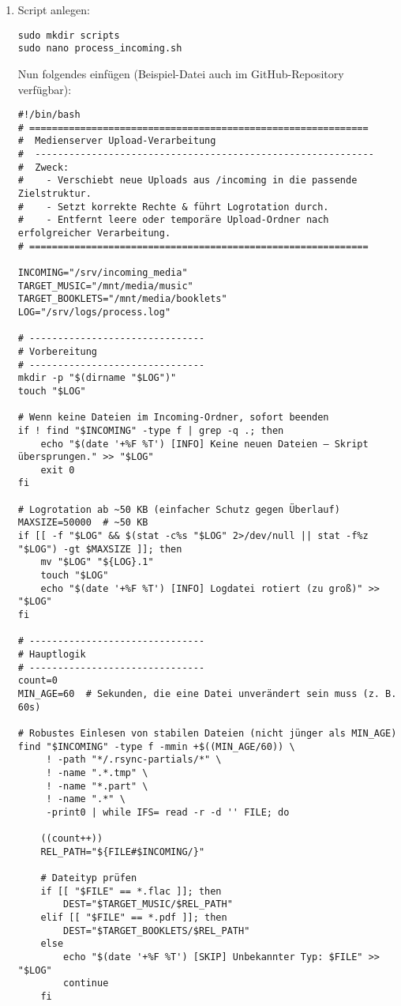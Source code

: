 \documentclass[12pt,a4paper]{report}
\begin{document}
  \begin{enumerate}
    \item Script anlegen:
    \begin{verbatim}
sudo mkdir scripts
sudo nano process_incoming.sh
    \end{verbatim}

    Nun folgendes einfügen (Beispiel-Datei auch im GitHub-Repository verfügbar):
    \begin{verbatim}
#!/bin/bash
# ============================================================
#  Medienserver Upload-Verarbeitung
#  ------------------------------------------------------------
#  Zweck:
#    - Verschiebt neue Uploads aus /incoming in die passende Zielstruktur.
#    - Setzt korrekte Rechte & führt Logrotation durch.
#    - Entfernt leere oder temporäre Upload-Ordner nach erfolgreicher Verarbeitung.
# ============================================================

INCOMING="/srv/incoming_media"
TARGET_MUSIC="/mnt/media/music"
TARGET_BOOKLETS="/mnt/media/booklets"
LOG="/srv/logs/process.log"

# -------------------------------
# Vorbereitung
# -------------------------------
mkdir -p "$(dirname "$LOG")"
touch "$LOG"

# Wenn keine Dateien im Incoming-Ordner, sofort beenden
if ! find "$INCOMING" -type f | grep -q .; then
    echo "$(date '+%F %T') [INFO] Keine neuen Dateien – Skript übersprungen." >> "$LOG"
    exit 0
fi

# Logrotation ab ~50 KB (einfacher Schutz gegen Überlauf)
MAXSIZE=50000  # ~50 KB
if [[ -f "$LOG" && $(stat -c%s "$LOG" 2>/dev/null || stat -f%z "$LOG") -gt $MAXSIZE ]]; then
    mv "$LOG" "${LOG}.1"
    touch "$LOG"
    echo "$(date '+%F %T') [INFO] Logdatei rotiert (zu groß)" >> "$LOG"
fi

# -------------------------------
# Hauptlogik 
# -------------------------------
count=0
MIN_AGE=60  # Sekunden, die eine Datei unverändert sein muss (z. B. 60s)

# Robustes Einlesen von stabilen Dateien (nicht jünger als MIN_AGE)
find "$INCOMING" -type f -mmin +$((MIN_AGE/60)) \
     ! -path "*/.rsync-partials/*" \
     ! -name ".*.tmp" \
     ! -name "*.part" \
     ! -name ".*" \
     -print0 | while IFS= read -r -d '' FILE; do

    ((count++))
    REL_PATH="${FILE#$INCOMING/}"

    # Dateityp prüfen
    if [[ "$FILE" == *.flac ]]; then
        DEST="$TARGET_MUSIC/$REL_PATH"
    elif [[ "$FILE" == *.pdf ]]; then
        DEST="$TARGET_BOOKLETS/$REL_PATH"
    else
        echo "$(date '+%F %T') [SKIP] Unbekannter Typ: $FILE" >> "$LOG"
        continue
    fi


\end{verbatim}
\end{enumerate}
\end{document}
